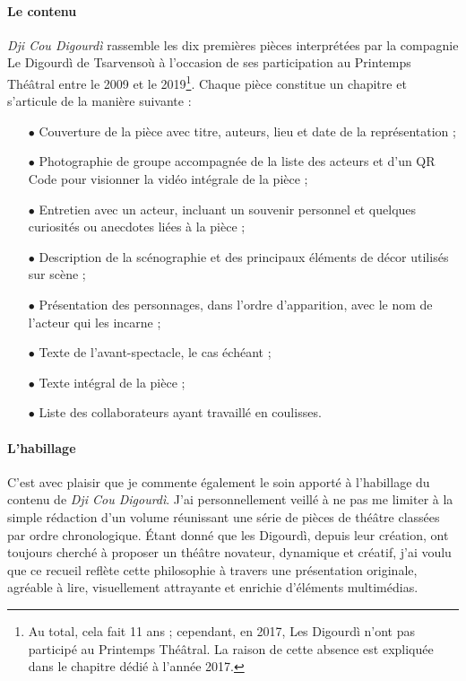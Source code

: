 \paragraph*{Le contenu}
\textit{Dji Cou Digourdì} rassemble les dix premières pièces interprétées par la compagnie Le Digourdì de Tsarvensoù à l'occasion de ses participation au Printemps Thé\^atral entre le 2009 et le 2019\footnote{ Au total, cela fait 11 ans ; cependant, en 2017, Les Digourdì n'ont pas participé au Printemps Thé\^atral. La raison de cette absence est expliquée dans le chapitre dédié à l'année 2017.}. Chaque pièce constitue un chapitre et s'articule de la manière suivante :
\begin{itemize}
\item[$\bullet$] Couverture de la pièce avec titre, auteurs, lieu et date de la représentation ;
\item[$\bullet$] Photographie de groupe accompagnée de la liste des acteurs et d'un QR Code pour visionner la vidéo intégrale de la pièce ;
\item[$\bullet$] Entretien avec un acteur, incluant un souvenir personnel et quel\-ques curiosités ou anecdotes liées à la pièce ;
\item[$\bullet$] Description de la scénographie et des principaux éléments de décor utilisés sur scène ;
\item[$\bullet$] Présentation des personnages, dans l’ordre d’apparition, avec le nom de l’acteur qui les incarne ;
\item[$\bullet$] Texte de l’avant-spectacle, le cas échéant ;
\item[$\bullet$] Texte intégral de la pièce ;
\item[$\bullet$] Liste des collaborateurs ayant travaillé en coulisses.
\end{itemize}

\paragraph*{L'habillage}
C'est avec plaisir que je commente également le soin apporté à l'habillage du contenu de \textit{Dji Cou Digourdì}. J'ai personnellement veillé à ne pas me limiter à la simple rédaction d'un volume réunissant une série de pièces de théâtre classées par ordre chronologique. Étant donné que les Digourdì, depuis leur création, ont toujours cherché à proposer un théâtre novateur, dynamique et créatif, j'ai voulu que ce recueil  reflète cette philosophie à travers une présentation originale, agréable à lire, visuellement attrayante et enrichie d’éléments multimédias.

